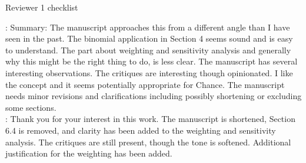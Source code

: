 \documentclass[11pt]{article}
\begin{document}
\footnotesize

\color{black}
\normalsize 

\bigskip

\begin{center}
{\LARGE Reviewer 1 checklist}
\end{center}


:
Summary: The manuscript approaches this from a different angle than I have 
seen in the past.  The binomial application in Section 4 seems sound and is 
easy to understand.  The part about weighting and sensitivity analysis and 
generally why this might be the right thing to do, is less clear.  The 
manuscript has several interesting observations.  The critiques are 
interesting though opinionated.  I like the concept and it seems potentially 
appropriate for Chance.  The manuscript needs minor revisions and 
clarifications including possibly shortening or excluding some sections. \\

: Thank you for your interest in this work.  The 
manuscript is shortened, Section 6.4 is removed, and clarity has been added 
to the weighting and sensitivity analysis.  The critiques are still present, 
though the tone is softened.  Additional justification for the weighting has 
been added. \\
\end{document}
